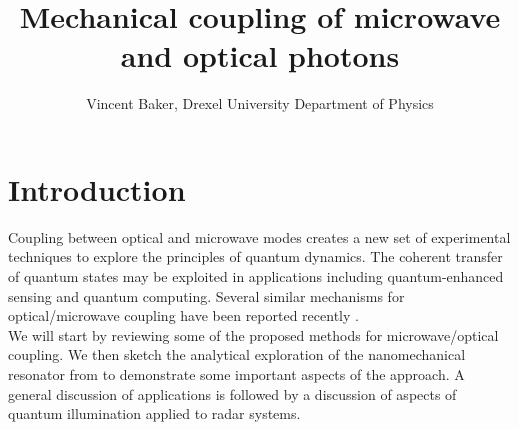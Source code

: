 \documentclass[a4paper,11pt, twocolumn]{article}
\title{Mechanical coupling of microwave and optical photons}
\author{Vincent Baker, Drexel University Department of Physics}
\numberwithin{equation}{section}
\begin{document}
\section{Introduction}
Coupling between optical and microwave modes creates a new set of experimental techniques to explore the principles of quantum dynamics.
The coherent transfer of quantum states may be exploited in applications including quantum-enhanced sensing and quantum computing.
Several similar mechanisms for optical/microwave coupling have been reported recently \cite{nanoCrystal, nanoMR}.\\
We will start by reviewing some of the proposed methods for microwave/optical coupling.
We then sketch the analytical exploration of the nanomechanical resonator from \cite{nanoMR} to demonstrate some important aspects of the approach. 
A general discussion of applications is followed by a discussion of aspects of quantum illumination applied to radar systems.
\end{document}
